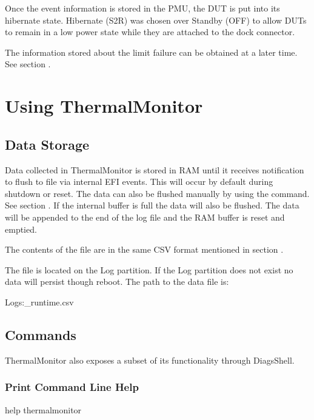 Once the event information is stored in the PMU, the DUT is put into its
hibernate state.  Hibernate (S2R) was chosen over Standby (OFF) to allow DUTs
to remain in a low power state while they are attached to the dock connector.

The information stored about the limit failure can be obtained at a later
time.  See section .

\section{Using ThermalMonitor}
\label{sec:UsingThermalMonitor}

\subsection{Data Storage}

Data collected in ThermalMonitor is stored in RAM until it receives
notification to flush to file via internal EFI events. This will occur by
default during shutdown or reset. The data can also be flushed manually by
using the  command. See section . If
the internal buffer is full the data will also be flushed. The data will be
appended to the end of the log file and the RAM buffer is reset and emptied.

The contents of the file are in the same CSV format mentioned in section
.

The file is located on the Log partition. If the Log partition does not exist no
data will persist though reboot. The path to the data file is:

\begin{Setting}
Logs:\MobileMediaFactoryLogs\LogCollector\FactoryDebug\temperature_runtime.csv 
\end{Setting}

\subsection{Commands}

ThermalMonitor also exposes a subset of its functionality through DiagsShell.

\subsubsection{Print Command Line Help}

\begin{CommandLine}
help thermalmonitor
\end{CommandLine}

